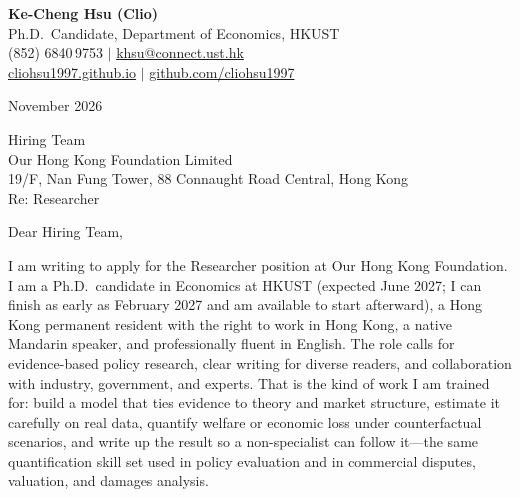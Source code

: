\documentclass[11pt,letterpaper]{article}
\begin{document}
\noindent
{\bfseries Ke-Cheng Hsu (Clio)}\\
Ph.D.\ Candidate, Department of Economics, HKUST\\
(852) 6840\,9753 \quad $|$ \quad \href{mailto:khsu@connect.ust.hk}{khsu@connect.ust.hk}\\
\href{https://cliohsu1997.github.io/}{cliohsu1997.github.io} \quad $|$ \quad \href{https://github.com/cliohsu1997}{github.com/cliohsu1997}

\vspace{0.7em}
 November 2026

\vspace{0.35em}
\noindent
Hiring Team\\
Our Hong Kong Foundation Limited\\
19/F, Nan Fung Tower, 88 Connaught Road Central, Hong Kong\\
Re: Researcher

\vspace{0.2em}
Dear Hiring Team,

I am writing to apply for the Researcher position at Our Hong Kong Foundation. I am a Ph.D.\ candidate in Economics at HKUST (expected June 2027; I can finish as early as February 2027 and am available to start afterward), a Hong Kong permanent resident with the right to work in Hong Kong, a native Mandarin speaker, and professionally fluent in English. The role calls for evidence-based policy research, clear writing for diverse readers, and collaboration with industry, government, and experts. That is the kind of work I am trained for: build a model that ties evidence to theory and market structure, estimate it carefully on real data, quantify welfare or economic loss under counterfactual scenarios, and write up the result so a non-specialist can follow it---the same quantification skill set used in policy evaluation and in commercial disputes, valuation, and damages analysis.
\end{document}
